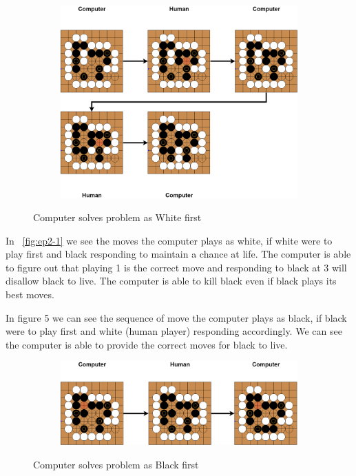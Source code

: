 \documentclass{l4proj}
\begin{document}
\begin{figure}[!ht]
\centering
\begin{subfigure}[b]{0.8\textwidth}
\includegraphics[width=\textwidth]{ep2/ep2-1.png}
\end{subfigure}
\caption{Computer solves problem as White first}
\label{fig:ep2-1}
\end{figure}


In ~\autoref{fig:ep2-1} we see the moves the computer plays as white, if white were to play first and black responding to maintain a chance at life. The computer is able to figure out that playing 1 is the correct move and responding to black at 3 will disallow black to live. The computer is able to kill black even if black plays its best moves.

In figure 5 we can see the sequence of move the computer plays as black, if black were to play first and white (human player) responding accordingly. We can see the computer is able to provide the correct moves for black to live.

\begin{figure}[!ht]
\centering
\begin{subfigure}[b]{\textwidth}
\includegraphics[width=\textwidth]{ep2/ep2-2.png}
\end{subfigure}
\caption{Computer solves problem as Black first}
\label{fig:ep2-2}
\end{figure}
\end{document}
